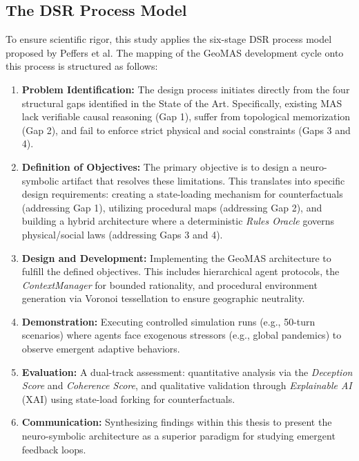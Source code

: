 \subsection{The DSR Process Model}
To ensure scientific rigor, this study applies the six-stage DSR process model proposed by Peffers et al.\cite{peffers2007design} The mapping of the GeoMAS development cycle onto this process is structured as follows:
\begin{enumerate}
    \item \textbf{Problem Identification:} The design process initiates directly from the four structural gaps identified in the State of the Art. Specifically, existing MAS lack verifiable causal reasoning (Gap 1), suffer from topological memorization (Gap 2), and fail to enforce strict physical and social constraints (Gaps 3 and 4).
    \item \textbf{Definition of Objectives:} The primary objective is to design a neuro-symbolic artifact that resolves these limitations. This translates into specific design requirements: creating a state-loading mechanism for counterfactuals (addressing Gap 1), utilizing procedural maps (addressing Gap 2), and building a hybrid architecture where a deterministic \textit{Rules Oracle} governs physical/social laws (addressing Gaps 3 and 4).
    \item \textbf{Design and Development:} Implementing the GeoMAS architecture to fulfill the defined objectives. This includes hierarchical agent protocols, the \textit{ContextManager} for bounded rationality, and procedural environment generation via Voronoi tessellation to ensure geographic neutrality.
    \item \textbf{Demonstration:} Executing controlled simulation runs (e.g., 50-turn scenarios) where agents face exogenous stressors (e.g., global pandemics) to observe emergent adaptive behaviors.
    \item \textbf{Evaluation:} A dual-track assessment: quantitative analysis via the \textit{Deception Score} and \textit{Coherence Score}, and qualitative validation through \textit{Explainable AI} (XAI) using state-load forking for counterfactuals.
    \item \textbf{Communication:} Synthesizing findings within this thesis to present the neuro-symbolic architecture as a superior paradigm for studying emergent feedback loops.
\end{enumerate}

